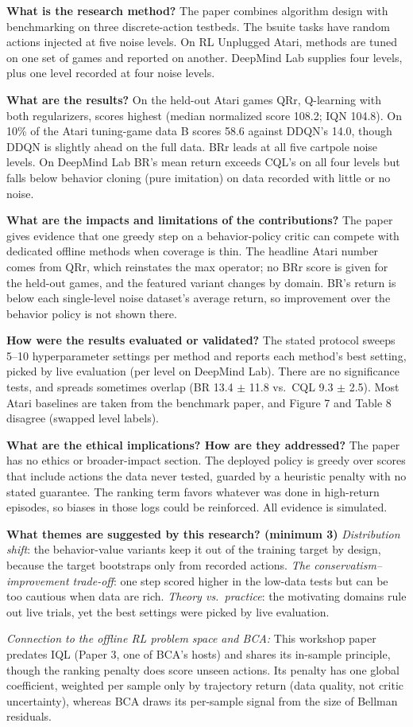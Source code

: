 \documentclass[11pt]{article}
\newcommand{\q}[2]{\item \textbf{#1} #2}
\newcommand{\tiein}[1]{\par\smallskip\noindent\emph{Connection to the offline RL problem space and BCA:} #1\par\medskip}
\begin{document}
\begin{qna}
\q{What is the research method?}
The paper combines algorithm design with benchmarking on three discrete-action testbeds. The bsuite tasks have random actions injected at five noise levels. On RL Unplugged Atari, methods are tuned on one set of games and reported on another. DeepMind Lab supplies four levels, plus one level recorded at four noise levels.

\q{What are the results?}
On the held-out Atari games QRr, Q-learning with both regularizers, scores highest (median normalized score 108.2; IQN 104.8). On 10\% of the Atari tuning-game data B scores 58.6 against DDQN's 14.0, though DDQN is slightly ahead on the full data. BRr leads at all five cartpole noise levels. On DeepMind Lab BR's mean return exceeds CQL's on all four levels but falls below behavior cloning (pure imitation) on data recorded with little or no noise.

\q{What are the impacts and limitations of the contributions?}
The paper gives evidence that one greedy step on a behavior-policy critic can compete with dedicated offline methods when coverage is thin. The headline Atari number comes from QRr, which reinstates the max operator; no BRr score is given for the held-out games, and the featured variant changes by domain. BR's return is below each single-level noise dataset's average return, so improvement over the behavior policy is not shown there.

\q{How were the results evaluated or validated?}
The stated protocol sweeps 5--10 hyperparameter settings per method and reports each method's best setting, picked by live evaluation (per level on DeepMind Lab). There are no significance tests, and spreads sometimes overlap (BR 13.4 $\pm$ 11.8 vs.\ CQL 9.3 $\pm$ 2.5). Most Atari baselines are taken from the benchmark paper, and Figure 7 and Table 8 disagree (swapped level labels).

\q{What are the ethical implications? How are they addressed?}
The paper has no ethics or broader-impact section. The deployed policy is greedy over scores that include actions the data never tested, guarded by a heuristic penalty with no stated guarantee. The ranking term favors whatever was done in high-return episodes, so biases in those logs could be reinforced. All evidence is simulated.

\q{What themes are suggested by this research? (minimum 3)}
\emph{Distribution shift}: the behavior-value variants keep it out of the training target by design, because the target bootstraps only from recorded actions. \emph{The conservatism--improvement trade-off}: one step scored higher in the low-data tests but can be too cautious when data are rich. \emph{Theory vs.\ practice}: the motivating domains rule out live trials, yet the best settings were picked by live evaluation.

\end{qna}
\tiein{This workshop paper predates IQL (Paper 3, one of BCA's hosts) and shares its in-sample principle, though the ranking penalty does score unseen actions. Its penalty has one global coefficient, weighted per sample only by trajectory return (data quality, not critic uncertainty), whereas BCA draws its per-sample signal from the size of Bellman residuals.}
\end{document}
